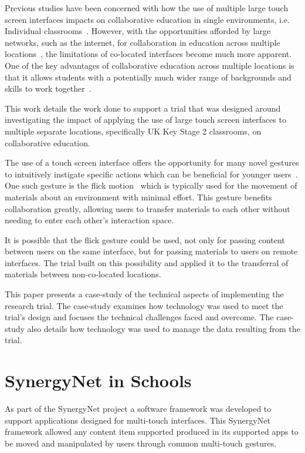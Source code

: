 \documentclass[a4paper,11pt]{article}
\begin{document}
Previous studies have been concerned with how the use of multiple large touch screen interfaces impacts on collaborative education in single environments, i.e. Individual classrooms~\cite{mohammed:2012,kreitmayer:2013,mercier:2015}.
However, with the opportunities afforded by large networks, such as the internet, for collaboration in education across multiple locations~\cite{daradoumis:2000,mcconnell:2012}, the limitations of co-located interfaces become much more apparent.
One of the key advantages of collaborative education across multiple locations is that it allows students with a potentially much wider range of backgrounds and skills to work together~\cite{kizilcec:2013}.

This work details the work done to support a trial that was designed around investigating the impact of applying the use of large touch screen interfaces to multiple separate locations, specifically UK Key Stage 2 classrooms, on collaborative education.

The use of a touch screen interface offers the opportunity for many novel gestures to intuitively instigate specific actions which can be beneficial for younger users~\cite{kim:2007,wu:2003,rick:2009}.
One such gesture is the flick motion~\cite{reetz-et-al:2006} which is typically used for the movement of materials about an environment with minimal effort.
This gesture benefits collaboration greatly, allowing users to transfer materials to each other without needing to enter each other's interaction space.
 
It is possible that the flick gesture could be used, not only for passing content between users on the same interface, but for passing materials to users on remote interfaces.
The trial built on this possibility and applied it to the transferral of materials between non-co-located locations.

This paper presents a case-study of the technical aspects of implementing the research trial.
The case-study examines how technology was used to meet the trial's design and focuses the technical challenges faced and overcome.
The case-study also details how technology was used to manage the data resulting from the trial.


\section{SynergyNet in Schools}

As part of the SynergyNet project a software framework was developed to support applications designed for multi-touch interfaces.
This SynergyNet framework allowed any content item supported produced in its supported apps to be moved and manipulated by users through common multi-touch gestures.
\end{document}
